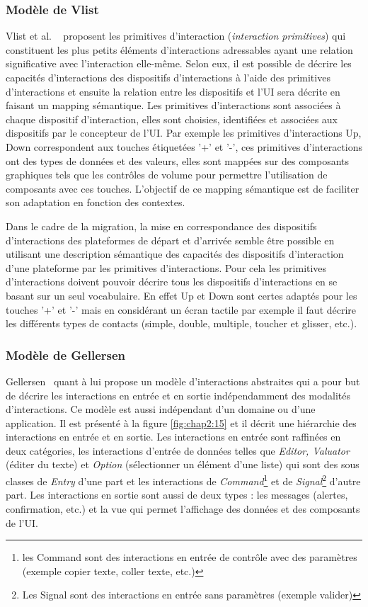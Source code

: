 \subsubsection{Modèle de Vlist}
Vlist et al. ~\cite{Vlist2011} proposent les primitives d'interaction (\textit{interaction primitives}) qui constituent les plus petits éléments d'interactions adressables ayant une relation significative avec l'interaction elle-même. Selon eux, il est possible de décrire les capacités d'interactions des dispositifs d'interactions  à l'aide des primitives d'interactions et ensuite la relation entre les dispositifs et l'UI sera décrite en faisant un mapping sémantique. Les primitives d'interactions sont associées à chaque dispositif d'interaction, elles sont choisies, identifiées et associées aux dispositifs par le concepteur de l'UI. Par exemple les primitives d'interactions Up, Down correspondent aux touches étiquetées '+' et '-', ces primitives d'interactions ont des types de données et des valeurs, elles sont mappées sur des composants graphiques tels que les contrôles de volume pour permettre l'utilisation de composants avec ces touches. L'objectif de ce mapping sémantique est de faciliter son adaptation en fonction des contextes.

Dans le cadre de la migration, la mise en correspondance des dispositifs d'interactions des plateformes de départ et d'arrivée semble être possible en utilisant une description sémantique des capacités des dispositifs d'interaction d'une plateforme par les primitives d'interactions. Pour cela les primitives d'interactions doivent pouvoir décrire tous les dispositifs d'interactions en se basant sur un seul vocabulaire. En effet Up et Down sont certes adaptés pour les touches '+' et '-' mais en considérant un écran tactile par exemple il faut décrire les différents types de contacts (simple, double, multiple, toucher et glisser, etc.).
\subsubsection{Modèle de Gellersen}
Gellersen~\cite{Gellersen1995}  quant à lui propose un modèle d'interactions abstraites qui a pour but de décrire les interactions en entrée et en sortie indépendamment des modalités d'interactions. Ce modèle est aussi indépendant d'un domaine ou d'une application. Il est présenté à la figure \ref{fig:chap2:15} et il décrit une hiérarchie des interactions en entrée et en sortie. Les interactions en entrée sont raffinées en deux catégories, les interactions d'entrée de données telles que \textit{Editor, Valuator} (éditer du texte) et \textit{Option} (sélectionner un élément d'une liste) qui sont des sous classes de \textit{Entry} d'une part et les interactions de \textit{Command}\footnote{les Command sont des interactions en entrée de contrôle avec des paramètres (exemple copier texte, coller texte, etc.)} et de \textit{Signal}\footnote{Les Signal sont des interactions en entrée sans paramètres (exemple valider)} d'autre part. Les interactions en sortie sont aussi de deux types : les messages (alertes, confirmation, etc.) et la vue qui permet l'affichage des données et des composants de l'UI. 

